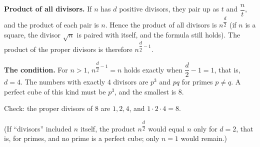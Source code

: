 \textbf{Product of all divisors.} If $n$ has $d$ positive divisors, they pair up as $t$ and $\dfrac {n}{t}$, and the product of each pair is $n$. Hence the product of all divisors is $n^{\dfrac {d}{2}}$ (if $n$ is a square, the divisor $\sqrt n$ is paired with itself, and the formula still holds). The product of the proper divisors is therefore $n^{\dfrac {d}{2}-1}$.

\textbf{The condition.} For $n>1$, $n^{\dfrac {d}{2}-1}=n$ holds exactly when $\dfrac {d}{2}-1=1$, that is, $d=4$. The numbers with exactly $4$ divisors are $p^3$ and $pq$ for primes $p\ne q$. A perfect cube of this kind must be $p^3$, and the smallest is $\boxed{8}$.

Check: the proper divisors of $8$ are $1,2,4$, and $1\cdot2\cdot4=8$.

(If ``divisors'' included $n$ itself, the product $n^{\dfrac {d}{2}}$ would equal $n$ only for $d=2$, that is, for primes, and no prime is a perfect cube; only $n=1$ would remain.)
